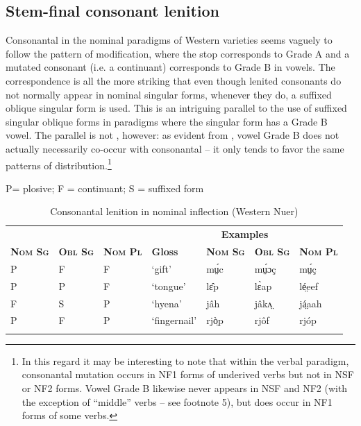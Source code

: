 \documentclass[output=paper,newtxmath,modfonts,nonflat]{langsci/langscibook}
\begin{document}
\subsection{Stem-final consonant lenition}

Consonantal  in the nominal paradigms of Western  varieties seems vaguely to follow the pattern of  modification, where the stop corresponds to Grade A and a mutated consonant (i.e. a continuant) corresponds to Grade B in vowels. The correspondence is all the more striking that even though lenited consonants do not normally appear in nominal singular forms, whenever they do, a suffixed oblique singular form is used. This is an intriguing parallel to the use of suffixed singular oblique forms in paradigms where the  singular form has a Grade B vowel. The parallel is not , however: as evident from , vowel Grade B does not actually necessarily co-occur with consonantal  – it only tends to favor the same patterns of distribution.\footnote{In this regard it may be interesting to note that within the verbal paradigm, consonantal mutation occurs in NF1 forms of underived verbs but not in NSF or NF2 forms. Vowel Grade B likewise never appears in NSF and NF2 (with the exception of “middle” verbs – see footnote 5), but does occur in NF1 forms of some verbs.}

\begin{table}
P= plosive; F = continuant; S = suffixed form
\begin{tabularx}{\textwidth}{lllXlll}
\lsptoprule

 & & & \multicolumn{4}{c}{\bfseries Examples}\\
\cmidrule{4-7}
\bfseries\scshape Nom Sg & \bfseries\scshape Obl Sg & \bfseries\scshape Nom Pl &  \bfseries Gloss & \bfseries\scshape Nom Sg & \bfseries\scshape Obl Sg & \bfseries\scshape Nom Pl\\
\midrule
P & F & F & ‘gift’ & mṳ́c & mṳ́ɔç & mṳ́ç\\
P & P & F & ‘tongue’ & lɛ̂p & lɛ̀ap & lé̤eef\\
F & S & P & ‘hyena’ & jâh & jâkʌ̤ & já̤aah\\
P & F & P & ‘fingernail’ & rjò̤p & rjôf & rjóp\\
\lspbottomrule
\end{tabularx}
\caption{Consonantal lenition in nominal inflection (Western Nuer)}
\label{tab:monich:21}
\end{table}
\end{document}
